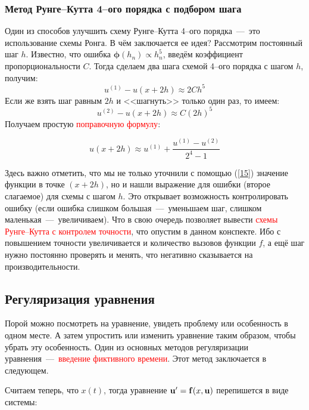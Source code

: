 \documentclass[a4,14pt,russian]{article}
\begin{document}
\subsubsection{Метод Рунге--Кутта 4--ого порядка с подбором шага}
    Один из способов улучшить схему Рунге--Кутта 4--ого порядка~---~это использование схемы Ронга. В чём заключается ее идея? Рассмотрим постоянный шаг $h$. Известно, что ошибка $\boldsymbol{\phi} (h_n) \propto h_n^5$, введём коэффициент пропорциональности $C$. Тогда сделаем два шага схемой 4--ого порядка с шагом $h$, получим:
    \begin{equation}
        u^{(1)} - u(x + 2h) \approx 2Ch^5
    \end{equation}
    Если же взять шаг равным $2h$ и <<шагнуть>> только один раз, то имеем:
    \begin{equation}
        u^{(2)} - u(x + 2h) \approx C(2h)^5
    \end{equation}
    Получаем простую \textcolor{red}{поправочную формулу}:
    
    \begin{equation}\label{15}
        u(x + 2h) \approx u^{(1)} + \frac{u^{(1)}-u^{(2)}}{2^4-1}
    \end{equation}
    
    Здесь важно отметить, что мы не только уточнили с помощью (\ref{15}) значение функции в точке $(x+2h)$, но и нашли выражение для ошибки (второе слагаемое) для схемы с шагом $h$. Это открывает возможность контролировать ошибку (если ошибка слишком большая~---~уменьшаем шаг, слишком маленькая~---~увеличиваем). Что в свою очередь позволяет вывести \textcolor{red}{схемы Рунге--Кутта с контролем точности}, что опустим в данном конспекте. Ибо с повышением точности увеличивается и количество вызовов функции $f$, а ещё шаг нужно постоянно проверять и менять, что негативно сказывается на производительности.   
\subsection{Регуляризация уравнения}\label{regul}
    Порой можно посмотреть на уравнение, увидеть проблему или особенность в одном месте. А затем упростить или изменить уравнение таким образом, чтобы убрать эту особенность. Один из основных методов регуляризации уравнения~---~\textcolor{red}{введение фиктивного времени}. Этот метод заключается в следующем.\par
    Считаем теперь, что $x(t)$, тогда уравнение ${\bf u}' = {\bf f}(x, {\bf u})$ перепишется в виде системы:
    
\end{document}
